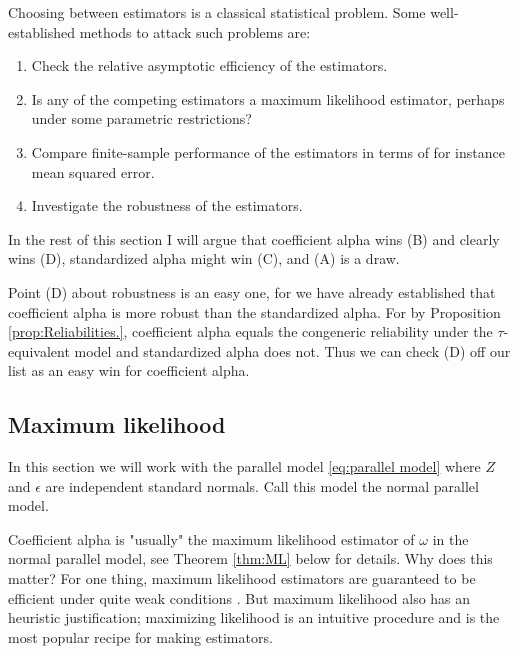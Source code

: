 \documentclass[twoside]{article}
\DeclareMathOperator{\Cor}{Cor}
\renewcommand{\sqrt}[1]{{(#1)^{1/2}}}
\begin{document}
Choosing between estimators is a classical statistical problem. Some well-established methods to attack such problems are:


\begin{enumerate}[label=(\Alph*)]
\item Check the relative asymptotic efficiency of the estimators.
\item Is any of the competing estimators a maximum likelihood estimator, perhaps under some parametric restrictions?
\item Compare finite-sample performance of the estimators in terms of for instance mean squared error.
\item Investigate the robustness of the estimators.
\end{enumerate}

In the rest of this section I will argue that coefficient alpha wins (B) and clearly wins (D), standardized alpha might win (C), and (A) is a draw.  

Point (D) about robustness is an easy one, for we have already established that coefficient alpha is more robust than the standardized alpha. For by Proposition \ref{prop:Reliabilities.}, coefficient alpha equals the congeneric reliability under the $\tau$-equivalent model and standardized alpha does not. Thus we can check (D) off our list as an easy win for coefficient alpha.

\subsection{Maximum likelihood}
In this section we will work with the parallel model \eqref{eq:parallel model} where $Z$ and $\epsilon$ are independent standard normals. Call this model the normal parallel model.

Coefficient alpha is "usually" the maximum likelihood estimator of $\omega$ in the normal parallel model, see Theorem \ref{thm:ML} below for details. Why does this matter? For one thing, maximum likelihood estimators are guaranteed to be efficient under quite weak conditions \citep[][Section 7.3]{Lehmann2004-ke}. But maximum likelihood also has an heuristic justification; maximizing likelihood is an intuitive procedure and is the most popular recipe for making estimators.
\end{document}
